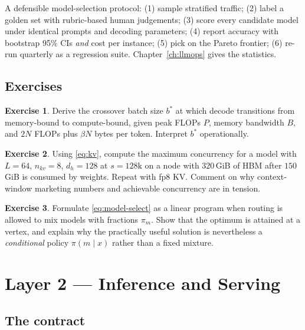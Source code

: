 \documentclass[11pt,twoside,openright]{book}
\theoremstyle{definition}
\newtheorem{exercise}{Exercise}[chapter]
\theoremstyle{plain}
\theoremstyle{remark}
\begin{document}
\begin{practice}
A defensible model-selection protocol: (1) sample stratified traffic; (2) label
a golden set with rubric-based human judgements; (3) score every candidate model
under identical prompts and decoding parameters; (4) report accuracy with
bootstrap 95\% CIs \emph{and} cost per instance; (5) pick on the Pareto
frontier; (6) re-run quarterly as a regression suite. Chapter~\ref{ch:llmops}
gives the statistics.
\end{practice}

\section{Exercises}

\begin{exercise}
Derive the crossover batch size $b^{*}$ at which decode transitions from
memory-bound to compute-bound, given peak FLOPs $P$, memory bandwidth $B$, and
$2N$ FLOPs plus $\beta N$ bytes per token. Interpret $b^{*}$ operationally.
\end{exercise}

\begin{exercise}
Using \eqref{eq:kv}, compute the maximum concurrency for a model with
$L=64$, $n_{kv}=8$, $d_h=128$ at $s=128\text{k}$ on a node with $320$\,GiB of
HBM after $150$\,GiB is consumed by weights. Repeat with fp8 KV. Comment on why
context-window marketing numbers and achievable concurrency are in tension.
\end{exercise}

\begin{exercise}
Formulate \eqref{eq:model-select} as a linear program when routing is allowed to
mix models with fractions $\pi_m$. Show that the optimum is attained at a vertex,
and explain why the practically useful solution is nevertheless a
\emph{conditional} policy $\pi(m \mid x)$ rather than a fixed mixture.
\end{exercise}

\cleardoublepage

\chapter{Layer 2 --- Inference and Serving}
\label{ch:serving}

\section{The contract}
\end{document}
